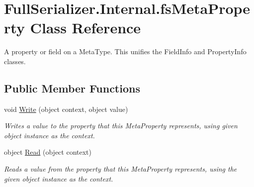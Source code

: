\hypertarget{class_full_serializer_1_1_internal_1_1fs_meta_property}{}\section{Full\+Serializer.\+Internal.\+fs\+Meta\+Property Class Reference}
\label{class_full_serializer_1_1_internal_1_1fs_meta_property}


A property or field on a Meta\+Type. This unifies the Field\+Info and Property\+Info classes.  


\subsection*{Public Member Functions}
\begin{DoxyCompactItemize}
\item 
void \hyperlink{class_full_serializer_1_1_internal_1_1fs_meta_property_ae201dc2b432cfdb36aa124743a29eb64}{Write} (object context, object value)
\begin{DoxyCompactList}\small\item\em Writes a value to the property that this Meta\+Property represents, using given object instance as the context. \end{DoxyCompactList}\item 
object \hyperlink{class_full_serializer_1_1_internal_1_1fs_meta_property_a6b90255d4c04c1d09e9aa112463637f1}{Read} (object context)
\begin{DoxyCompactList}\small\item\em Reads a value from the property that this Meta\+Property represents, using the given object instance as the context. \end{DoxyCompactList}\end{DoxyCompactItemize}
